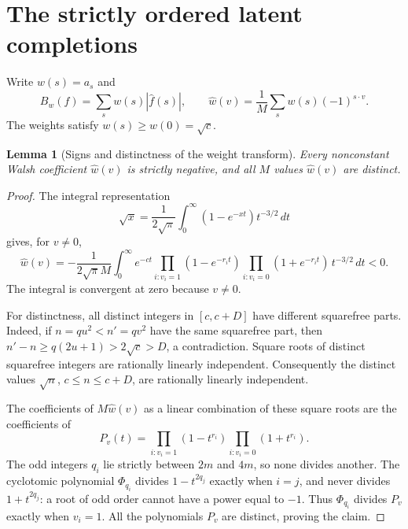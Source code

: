 \documentclass[11pt]{article}
\newtheorem{lemma}[theorem]{Lemma}
\begin{document}
\section{The strictly ordered latent completions}

Write $w(s)=a_s$ and
\[
 B_w(f)=\sum_s w(s)|\widehat f(s)|,
 \qquad
 \widehat w(v)=\frac1M\sum_s w(s)(-1)^{s\cdot v}.
\]
The weights satisfy $w(s)\ge w(0)=\sqrt c$.

\begin{lemma}[Signs and distinctness of the weight transform]\label{lem:weights}
Every nonconstant Walsh coefficient $\widehat w(v)$ is strictly
negative, and all $M$ values $\widehat w(v)$ are distinct.
\end{lemma}
\begin{proof}
The integral representation
\[
 \sqrt x=\frac1{2\sqrt\pi}\int_0^\infty(1-e^{-xt})t^{-3/2}\,dt
\]
gives, for $v\ne0$,
\[
 \widehat w(v)=-\frac1{2\sqrt\pi M}
 \int_0^\infty e^{-ct}
 \prod_{i:v_i=1}(1-e^{-r_i t})
 \prod_{i:v_i=0}(1+e^{-r_i t})\,t^{-3/2}\,dt<0.
\]
The integral is convergent at zero because $v\ne0$.

For distinctness, all distinct integers in $[c,c+D]$ have different
squarefree parts. Indeed, if $n=qu^2<n'=qv^2$ have the same squarefree
part, then
$n'-n\ge q(2u+1)>2\sqrt c>D$, a contradiction. Square roots of
distinct squarefree integers are rationally linearly independent.
Consequently the distinct values $\sqrt n$, $c\le n\le c+D$, are
rationally linearly independent.

The coefficients of $M\widehat w(v)$ as a linear combination of these
square roots are the coefficients of
\[
 P_v(t)=\prod_{i:v_i=1}(1-t^{r_i})
         \prod_{i:v_i=0}(1+t^{r_i}).
\]
The odd integers $q_i$ lie strictly between $2m$ and $4m$, so none
divides another. The cyclotomic polynomial $\Phi_{q_i}$ divides
$1-t^{2q_j}$ exactly when $i=j$, and never divides
$1+t^{2q_j}$: a root of odd order cannot have a power equal to $-1$.
Thus $\Phi_{q_i}$ divides $P_v$ exactly when $v_i=1$. All the
polynomials $P_v$ are distinct, proving the claim.
\end{proof}
\end{document}
